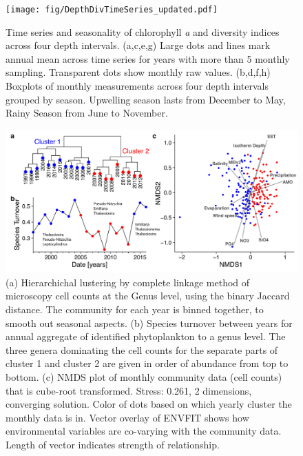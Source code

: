 \documentclass[draft]{agujournal2019}
\begin{document}
\begin{figure}
\begin{center}
\noindent\texttt{[image: fig/DepthDivTimeSeries\_updated.pdf]}
\end{center}
\caption{Time series and seasonality of chlorophyll \textit{a} and diversity indices across four depth intervals. (a,c,e,g) Large dots and lines mark annual mean across time series for years with more than 5 monthly sampling. Transparent dots show monthly raw values. (b,d,f,h) Boxplots of monthly measurements across four depth intervals grouped by season. Upwelling season lasts from December to May, Rainy Season from June to November.}
\label{fig:divts}
\end{figure}



\begin{figure}
\noindent\includegraphics[width=\textwidth]{fig/Figure4_ClusteringNMDS_v2.pdf}
\caption{(a) Hierarchichal lustering by complete linkage method of microscopy cell counts at the Genus level, using the binary Jaccard distance. The community for each year is binned together, to smooth out seasonal aspects. (b) Species turnover between years for annual aggregate of identified phytoplankton to a genus level. The three genera dominating the cell counts for the separate parts of cluster 1 and cluster 2 are given in order of abundance from top to bottom. (c) NMDS plot of monthly community data (cell counts) that is cube-root transformed. Stress: 0.261, 2 dimensions, converging solution. Color of dots based on which yearly cluster the monthly data is in. Vector overlay of ENVFIT shows how environmental variables are co-varying with the community data. Length of vector indicates strength of relationship.}
\label{fig:clustering}
\end{figure}
\end{document}
